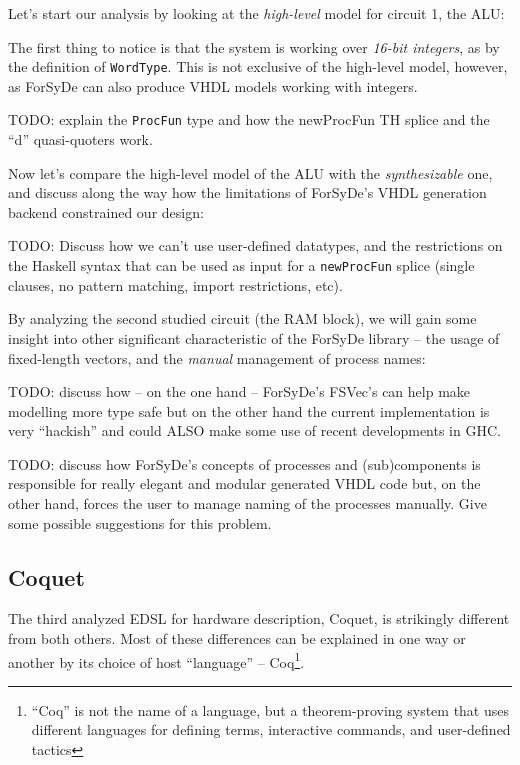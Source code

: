 \documentclass[a4paper]{article}
\begin{document}
                Let's start our analysis by looking at the \emph{high-level} model for circuit 1,
                the ALU:
                

                The first thing to notice is that the system is working over \emph{16-bit integers},
                as by the definition of \texttt{WordType}. This is not exclusive of the high-level
                model, however, as ForSyDe can also produce VHDL models working with integers.

                TODO: explain the \texttt{ProcFun} type and how the newProcFun TH splice and the
                ``d'' quasi-quoters work.

                Now let's compare the high-level model of the ALU with the \emph{synthesizable} one,
                and discuss along the way how the limitations of ForSyDe's VHDL generation backend
                constrained our design:
                

                TODO: Discuss how we can't use user-defined datatypes, and the restrictions on the
                Haskell syntax that can be used as input for a \texttt{newProcFun} splice (single
                clauses, no pattern matching, import restrictions, etc).

                By analyzing the second studied circuit (the RAM block), we will gain some insight
                into other significant characteristic of the ForSyDe library -- the usage of
                fixed-length vectors, and the \emph{manual} management of process names:

                TODO: discuss how -- on the one hand -- ForSyDe's FSVec's can help make modelling
                more type safe but on the other hand the current implementation is very ``hackish''
                and could ALSO make some use of recent developments in GHC.

                TODO: discuss how ForSyDe's concepts of processes and (sub)components is responsible
                for really elegant and modular generated VHDL code but, on the other hand, forces
                the user to manage naming of the processes manually. Give some possible suggestions
                for this problem.

        \subsection{Coquet}
        \label{subsec:coquet}
            The third analyzed EDSL for hardware description, Coquet\cite{coquet2011},
            is strikingly different from both others. Most of these differences can be explained in
            one way or another by its choice of host ``language'' -- Coq\footnote{``Coq'' is not
                the name of a language, but a theorem-proving system that uses different languages
                for defining terms, interactive commands, and user-defined tactics}.
\end{document}
